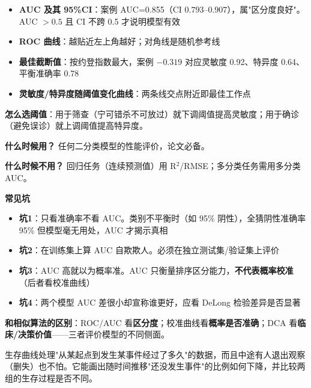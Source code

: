 \begin{algoresult}
\begin{itemize}
    \item \textbf{AUC 及其 95\%CI}：案例 AUC=0.855（CI $0.793$--$0.907$），属"区分度良好"。AUC $>0.5$ 且 CI 不跨 0.5 才说明模型有效
    \item \textbf{ROC 曲线}：越贴近左上角越好；对角线是随机参考线
    \item \textbf{最佳截断值}：按约登指数最大，案例 $-0.319$ 对应灵敏度 0.92、特异度 0.64、平衡准确率 0.78
    \item \textbf{灵敏度/特异度随阈值变化曲线}：两条线交点附近即最佳工作点
\end{itemize}

\textbf{怎么选阈值}：用于筛查（宁可错杀不可放过）就下调阈值提高灵敏度；用于确诊（避免误诊）就上调阈值提高特异度。
\end{algoresult}

\begin{algonotes}
\textbf{什么时候用？} 任何二分类模型的性能评价，论文必备。

\textbf{什么时候不用？} 回归任务（连续预测值）用 R$^2$/RMSE；多分类任务需用多分类 AUC。

\textbf{常见坑}
\begin{itemize}
    \item \textbf{坑1}：只看准确率不看 AUC。类别不平衡时（如 95\% 阴性），全猜阴性准确率 95\% 但模型毫无用处，AUC 才揭示真相
    \item \textbf{坑2}：在训练集上算 AUC 自欺欺人。必须在独立测试集/验证集上评价
    \item \textbf{坑3}：AUC 高就以为概率准。AUC 只衡量排序区分能力，\textbf{不代表概率校准}（后者看校准曲线）
    \item \textbf{坑4}：两个模型 AUC 差很小却宣称谁更好，应看 DeLong 检验差异是否显著
\end{itemize}

\textbf{和相似算法的区别}：ROC/AUC 看\textbf{区分度}；校准曲线看\textbf{概率是否准确}；DCA 看\textbf{临床/决策价值}——三者评价模型的不同侧面。
\end{algonotes}


\begin{algointro}
生存曲线处理"从某起点到发生某事件经过了多久"的数据，而且中途有人退出观察（删失）也不怕。它能画出随时间推移"还没发生事件"的比例如何下降，并比较两组的生存过程是否不同。
\end{algointro}


